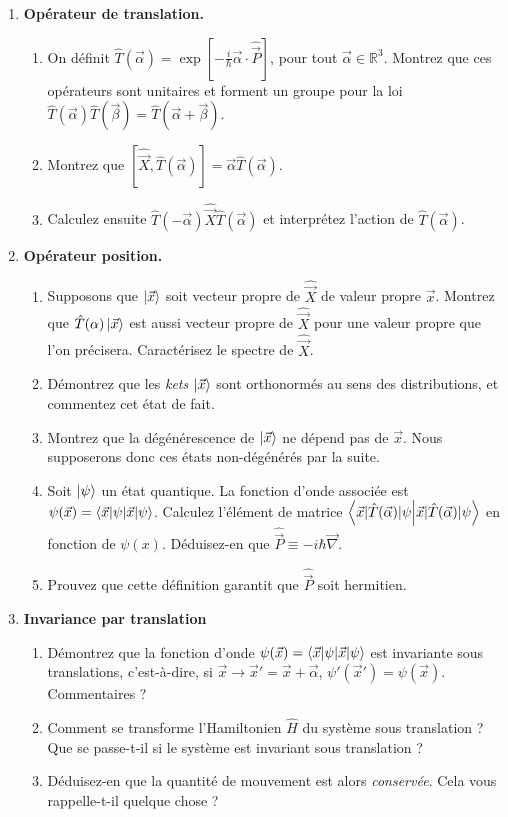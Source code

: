 \begin{enumerate}
\item \textbf{Opérateur de translation.}
\begin{enumerate}
\item On définit $\hat T(\vec\alpha) = \exp \left[{-\frac{i}{\hbar}\vec\alpha \cdot \hat{\vec P}}\right]$, pour tout $\vec\alpha \in \mathbb R^3$. Montrez que ces opérateurs sont unitaires et forment un groupe pour la loi $\hat T(\vec\alpha)\hat T(\vec\beta) = \hat T(\vec\alpha+\vec\beta)$. 
\item Montrez que $[\hat{\vec X},\hat T(\vec \alpha)] = \vec\alpha \hat T(\vec\alpha)$. 
\item Calculez ensuite $\hat T(-\vec\alpha) \hat{\vec X} \hat T(\vec\alpha)$ et interprétez l'action de $\hat T(\vec\alpha)$.
\end{enumerate}
\newpage
\item \textbf{Opérateur position.}
\begin{enumerate}
\item Supposons que $\ket{\vec x}$ soit vecteur propre de $\hat{\vec X}$ de valeur propre $\vec x$. Montrez que $\hat T(\alpha)\ket{\vec x}$ est aussi vecteur propre de $\hat{\vec X}$ pour une valeur propre que l'on précisera. Caractérisez le spectre de $\hat{\vec X}$.
\item Démontrez que les \textit{kets} $\ket{\vec x}$ sont orthonormés au sens des distributions, et commentez cet état de fait. 
\item Montrez que la dégénérescence de $\ket{\vec x}$ ne dépend pas de $\vec x$. Nous supposerons donc ces états non-dégénérés par la suite.
\item Soit $\ket{\psi}$ un état quantique. La fonction d'onde associée est $\psi(\vec x) = \braket{\vec x|\psi}$. Calculez l'élément de matrice $\braket{\vec x|\hat T(\vec \alpha)|\psi}$ en fonction de $\psi(x)$. Déduisez-en que $\hat{\vec P} \equiv -i\hbar \vec\nabla$.
\item Prouvez que cette définition garantit que $\hat{\vec P}$ soit hermitien.
\end{enumerate}
\item \textbf{Invariance par translation}
\begin{enumerate}
\item Démontrez que la fonction d'onde $\psi(\vec x) = \braket{\vec x|\psi}$ est invariante sous translations, c'est-à-dire, si $\vec x \to \vec x' = \vec x +\vec \alpha$, $\psi'(\vec x') = \psi(\vec x)$. Commentaires ?
\item Comment se transforme l'Hamiltonien $\hat H$ du système sous translation ? Que se passe-t-il si le système est invariant sous translation ?
\item Déduisez-en que la quantité de mouvement est alors \textit{conservée}. Cela vous rappelle-t-il quelque chose ?
\end{enumerate}


\end{enumerate}
$ $



